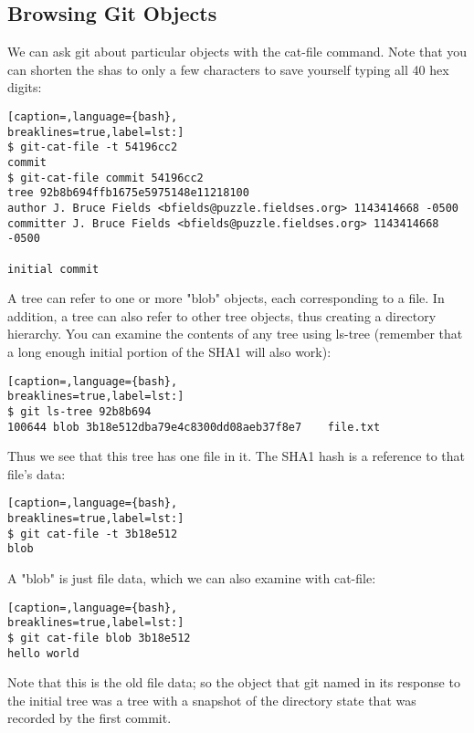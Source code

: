 \subsection{Browsing Git Objects}
We can ask git about particular objects with the cat-file command. Note that
you can shorten the shas to only a few characters to save yourself typing all
40 hex digits:
\lstset{basicstyle=\scriptsize, numbers=none, captionpos=b, tabsize=4}
\begin{lstlisting}[caption=,language={bash},
breaklines=true,label=lst:]
$ git-cat-file -t 54196cc2
commit
$ git-cat-file commit 54196cc2
tree 92b8b694ffb1675e5975148e11218100
author J. Bruce Fields <bfields@puzzle.fieldses.org> 1143414668 -0500
committer J. Bruce Fields <bfields@puzzle.fieldses.org> 1143414668 -0500

initial commit
\end{lstlisting}

A tree can refer to one or more "blob" objects, each corresponding to a file.
In addition, a tree can also refer to other tree objects, thus creating a
directory hierarchy. You can examine the contents of any tree using ls-tree
(remember that a long enough initial portion of the SHA1 will also work):
\lstset{basicstyle=\scriptsize, numbers=none, captionpos=b, tabsize=4}
\begin{lstlisting}[caption=,language={bash},
breaklines=true,label=lst:]
$ git ls-tree 92b8b694
100644 blob 3b18e512dba79e4c8300dd08aeb37f8e7    file.txt
\end{lstlisting}

Thus we see that this tree has one file in it. The SHA1 hash is a reference to
that file's data:
\lstset{basicstyle=\scriptsize, numbers=none, captionpos=b, tabsize=4}
\begin{lstlisting}[caption=,language={bash},
breaklines=true,label=lst:]
$ git cat-file -t 3b18e512
blob
\end{lstlisting}

A "blob" is just file data, which we can also examine with cat-file:
\lstset{basicstyle=\scriptsize, numbers=none, captionpos=b, tabsize=4}
\begin{lstlisting}[caption=,language={bash},
breaklines=true,label=lst:]
$ git cat-file blob 3b18e512
hello world
\end{lstlisting}

Note that this is the old file data; so the object that git named in its
response to the initial tree was a tree with a snapshot of the directory state
that was recorded by the first commit.

